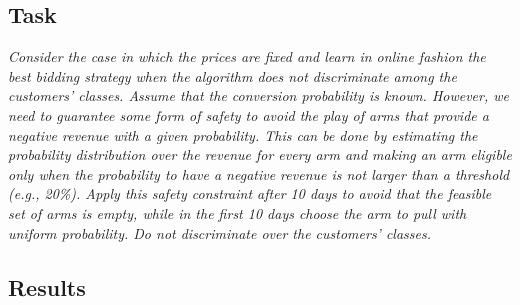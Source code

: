 \documentclass[12pt,a4paper]{report}
\begin{document}
			\subsection{Task}
\textit{Consider the case in which the prices are fixed and learn in online fashion the best bidding strategy when the algorithm does not discriminate among the customers’ classes. Assume that the conversion probability is known. However, we need to guarantee some form of safety to avoid the play of arms that provide a negative revenue with a given probability. This can be done by estimating the probability distribution over the revenue for every arm and making an arm eligible only when the probability to have a negative revenue is not larger than a threshold (e.g., 20\%). Apply this safety constraint after 10 days to avoid that the feasible set of arms is empty, while in the first 10 days choose the arm to pull with uniform probability. Do not discriminate over the customers’ classes.}
			\subsection{Results}
\end{document}

